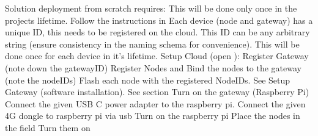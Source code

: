 Solution deployment from scratch requires:\markdownRendererInterblockSeparator
{}\markdownRendererUlBeginTight
\markdownRendererUlItem {}\markdownRendererUlItemEnd 
\markdownRendererUlEndTight \markdownRendererInterblockSeparator
{}This will be done only once in the projects lifetime.\markdownRendererInterblockSeparator
{}Follow the instructions in \markdownRendererInterblockSeparator
{}\markdownRendererUlBegin
\markdownRendererUlItem {}\markdownRendererInterblockSeparator
{}Each device (node and gateway) has a unique ID, this needs to be registered on the cloud. This ID can be any arbitrary string (ensure consistency in the naming schema for convenience).\markdownRendererInterblockSeparator
{}This will be done once for each device in it's lifetime.\markdownRendererInterblockSeparator
{}\markdownRendererOlBeginTight
{}Setup Cloud (open ):\markdownRendererOlItemEnd 
\markdownRendererOlEndTight \markdownRendererInterblockSeparator
{}\markdownRendererUlBeginTight
\markdownRendererUlItem Register Gateway (note down the gatewayID)\markdownRendererUlItemEnd 
\markdownRendererUlItem Register Nodes and Bind the nodes to the gateway (note the nodeIDs)\markdownRendererUlItemEnd 
\markdownRendererUlEndTight \markdownRendererInterblockSeparator
{}\markdownRendererOlBegin
{}Flash each node with the registered NodeIDs. See \markdownRendererOlItemEnd 
{}Setup Gateway (software installation). See section \markdownRendererOlItemEnd 
\markdownRendererOlEnd \markdownRendererUlItemEnd 
\markdownRendererUlItem {}\markdownRendererUlItemEnd 
\markdownRendererUlEnd \markdownRendererInterblockSeparator
{}\markdownRendererOlBeginTight
{}Turn on the gateway (Raspberry Pi)\markdownRendererInterblockSeparator
{}\markdownRendererUlBeginTight
\markdownRendererUlItem Connect the given USB C power adapter to the raspberry pi.\markdownRendererUlItemEnd 
\markdownRendererUlItem Connect the given 4G dongle to raspberry pi via usb\markdownRendererUlItemEnd 
\markdownRendererUlItem Turn on the raspberry pi\markdownRendererUlItemEnd 
\markdownRendererUlEndTight \markdownRendererOlItemEnd 
{}Place the nodes in the field\markdownRendererOlItemEnd 
{}Turn them on\markdownRendererOlItemEnd 
\markdownRendererOlEndTight \relax